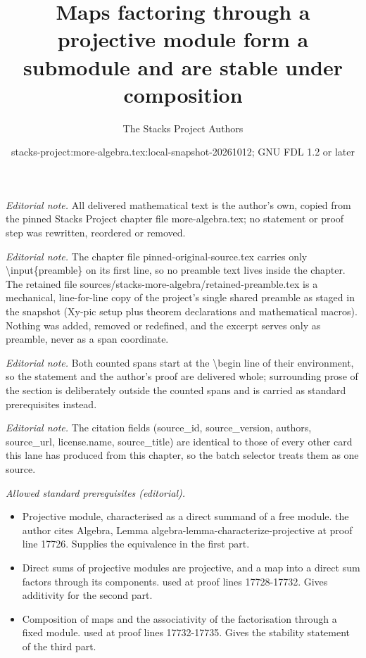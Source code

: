 \documentclass[10pt,a4paper]{amsart}
\title{Maps factoring through a projective module form a submodule and are stable under composition}
\author{The Stacks Project Authors}
\date{stacks-project:more-algebra.tex:local-snapshot-20261012; GNU FDL 1.2 or later}
\theoremstyle{plain}
\theoremstyle{definition}
\theoremstyle{remark}
\numberwithin{equation}{subsection}
\begin{document}
\maketitle
\setcounter{subsection}{1}
\noindent\textit{Editorial note.} All delivered mathematical text is the author's own, copied from the pinned Stacks Project chapter file more-algebra.tex; no statement or proof step was rewritten, reordered or removed.\par\medskip
\noindent\textit{Editorial note.} The chapter file pinned-original-source.tex carries only \textbackslash{}input\{preamble\} on its first line, so no preamble text lives inside the chapter. The retained file sources/stacks-more-algebra/retained-preamble.tex is a mechanical, line-for-line copy of the project's single shared preamble as staged in the snapshot (Xy-pic setup plus theorem declarations and mathematical macros). Nothing was added, removed or redefined, and the excerpt serves only as preamble, never as a span coordinate.\par\medskip
\noindent\textit{Editorial note.} Both counted spans start at the \textbackslash{}begin line of their environment, so the statement and the author's proof are delivered whole; surrounding prose of the section is deliberately outside the counted spans and is carried as standard prerequisites instead.\par\medskip
\noindent\textit{Editorial note.} The citation fields (source\_id, source\_version, authors, source\_url, license.name, source\_title) are identical to those of every other card this lane has produced from this chapter, so the batch selector treats them as one source.\par\medskip
\noindent\textit{Allowed standard prerequisites (editorial).}\begin{itemize}
\item Projective module, characterised as a direct summand of a free module. the author cites Algebra, Lemma algebra-lemma-characterize-projective at proof line 17726. Supplies the equivalence in the first part.
\item Direct sums of projective modules are projective, and a map into a direct sum factors through its components. used at proof lines 17728-17732. Gives additivity for the second part.
\item Composition of maps and the associativity of the factorisation through a fixed module. used at proof lines 17732-17735. Gives the stability statement of the third part.
\end{itemize}\medskip
\end{document}
